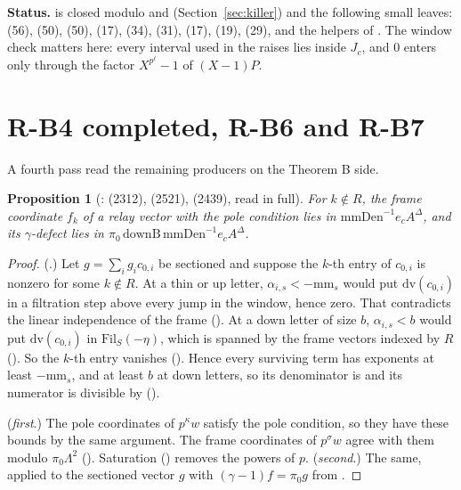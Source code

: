\documentclass[11pt]{article}
\newcommand{\Fil}{\mathrm{Fil}}
\newtheorem{prop}[lemma]{Proposition}
\theoremstyle{definition}
\theoremstyle{remark}
\begin{document}
\noindent\textbf{Status.}  is closed modulo  and  (Section~\ref{sec:killer}) and the following small leaves:  (56),  (50),  (50),  (17),  (34),  (31),  (17),  (19),  (29), and the  helpers of . The window check matters here: every interval used in the raises lies inside $J_c$, and $0$ enters only through the factor $X^{p^\ell}-1$ of $(X-1)P$.

\section{R-B4 completed, R-B6 and R-B7}\label{sec:bfinish}

A fourth pass read the remaining producers on the Theorem B side.

\begin{prop}[:  (2312),  (2521),  (2439), read in full]
For $k\notin R$, the frame coordinate $f_k$ of a relay vector with the pole condition lies in $\mathrm{mmDen}^{-1}e_cA^\Delta$, and its $\gamma$-defect lies in $\pi_0\,\mathrm{downB}\,\mathrm{mmDen}^{-1}e_cA^\Delta$.
\end{prop}
\begin{proof}
(.) Let $g=\sum_ig_ic_{0,i}$ be sectioned and suppose the $k$-th entry of $c_{0,i}$ is nonzero for some $k\notin R$. At a thin or up letter, $\alpha_{i,s}<-\mathrm{mm}_s$ would put $\mathrm{dv}(c_{0,i})$ in a filtration step above every jump in the window, hence zero. That contradicts the linear independence of the frame (). At a down letter of size $b$, $\alpha_{i,s}<b$ would put $\mathrm{dv}(c_{0,i})$ in $\Fil_S(-\eta)$, which is spanned by the frame vectors indexed by $R$ (). So the $k$-th entry vanishes (). Hence every surviving term has exponents at least $-\mathrm{mm}_s$, and at least $b$ at down letters, so its denominator is  and its numerator is divisible by  ().

(\emph{first}.) The pole coordinates of $p^\kappa w$ satisfy the pole condition, so they have these bounds by the same argument. The frame coordinates of $p^\sigma w$ agree with them modulo $\pi_0\Lambda^2$ (). Saturation () removes the powers of $p$. (\emph{second}.) The same, applied to the sectioned vector $g$ with $(\gamma-1)f=\pi_0g$ from .
\end{proof}
\end{document}
